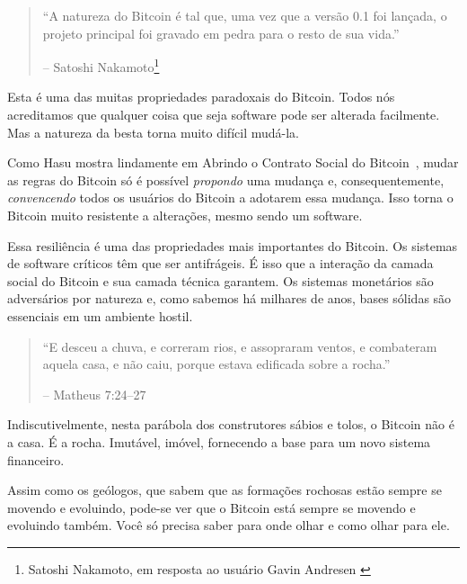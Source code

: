 \begin{quotation}\begin{samepage}
\enquote{A natureza do Bitcoin é tal que, uma vez que a versão 0.1 foi lançada, o projeto principal foi gravado em pedra para o resto de sua vida.}
\begin{flushright} -- Satoshi Nakamoto\footnote{Satoshi Nakamoto, em resposta ao usuário Gavin Andresen \cite{satoshi-centralized-nature}}
\end{flushright}\end{samepage}\end{quotation}

Esta é uma das muitas propriedades paradoxais do Bitcoin. Todos nós acreditamos que qualquer coisa que seja software pode ser alterada facilmente. Mas a natureza da besta torna muito difícil mudá-la.

Como Hasu mostra lindamente em Abrindo o Contrato Social do Bitcoin~\cite{social-contract}, mudar as regras do Bitcoin só é possível \textit{propondo} uma mudança e, consequentemente, \textit{convencendo} todos os usuários do Bitcoin a adotarem essa mudança. Isso torna o Bitcoin muito resistente a alterações, mesmo sendo um software.

Essa resiliência é uma das propriedades mais importantes do Bitcoin. Os sistemas de software críticos têm que ser antifrágeis. É isso que a interação da camada social do Bitcoin e sua camada técnica garantem. Os sistemas monetários são adversários por natureza e, como sabemos há milhares de anos, bases sólidas são essenciais em um ambiente hostil.

\begin{quotation}\begin{samepage}
\enquote{E desceu a chuva, e correram rios, e assopraram ventos, e combateram aquela casa, e não caiu, porque estava edificada sobre a rocha.}
\begin{flushright} -- Matheus 7:24--27
\end{flushright}\end{samepage}\end{quotation}

Indiscutivelmente, nesta parábola dos construtores sábios e tolos, o Bitcoin não é a casa. É a rocha. Imutável, imóvel, fornecendo a base para um novo sistema financeiro.

Assim como os geólogos, que sabem que as formações rochosas estão sempre se movendo e evoluindo, pode-se ver que o Bitcoin está sempre se movendo e evoluindo também. Você só precisa saber para onde olhar e como olhar para ele.

